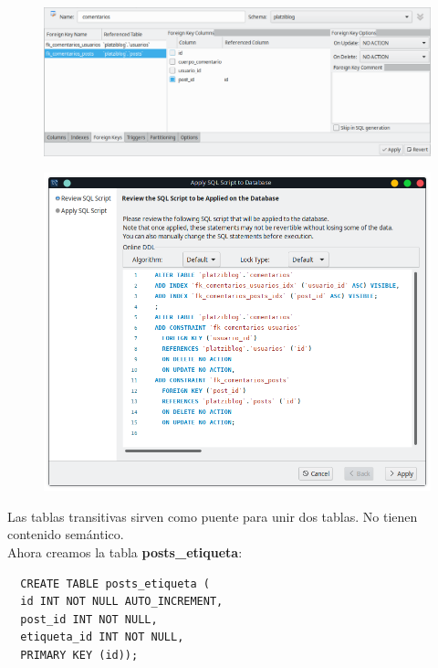 \documentclass{article}
\begin{document}
\begin{figure}[h!]
  \centering
  \includegraphics[scale=0.55]{./Pictures/072_fk_comentarios.png}
\end{figure}

\begin{figure}[h!]
  \centering
  \includegraphics[scale=0.55]{./Pictures/073_fk_comentarios_confirm.png}
\end{figure}


\newpage

Las tablas transitivas sirven como puente para unir dos tablas. No tienen
contenido semántico.\\

Ahora creamos la tabla \textbf{posts\_etiqueta}:

\begin{verbatim}
  CREATE TABLE posts_etiqueta (
  id INT NOT NULL AUTO_INCREMENT,
  post_id INT NOT NULL,
  etiqueta_id INT NOT NULL,
  PRIMARY KEY (id));
\end{verbatim}
\end{document}
